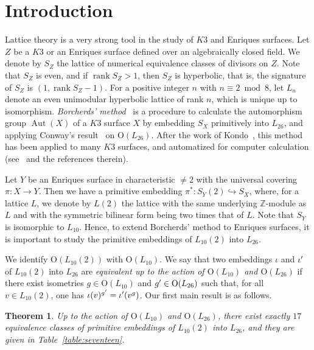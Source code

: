 \documentclass{amsart}
\newtheorem{theorem}{Theorem}[section]
\numberwithin{equation}{section}
\numberwithin{table}{section}
\numberwithin{figure}{section}
\newcommand{\Z}{\mathord{\mathbb Z}}
\newcommand{\inj}{\hookrightarrow}
\newcommand{\sprime}{\sp\prime}
\newcommand{\OG}{\mathord{\mathrm{O}}}
\newcommand{\Aut}{\operatorname{\mathrm{Aut}}\nolimits}
\newcommand{\rank}{\operatorname{\mathrm{rank}}\nolimits}
\begin{document}
\section{Introduction}\label{sec:intro}
%
Lattice theory is a
very strong tool in the study of $K3$ and Enriques surfaces.
Let $Z$ be a $K3$  or an Enriques surface defined over an algebraically closed field.
We denote by  $S_Z$  the lattice of numerical equivalence classes of
divisors on $Z$.
Note that $S_Z$ is even, and if $\rank S_Z>1$, then $S_Z$ is hyperbolic,
that is, the signature of $S_Z$ is $(1, \rank S_Z-1)$.
For a positive integer $n$ with $n\equiv 2\bmod 8$,
let $L_n$ denote an even unimodular hyperbolic lattice of rank $n$,
which is unique up to isomorphism.
\emph{Borcherds' method}~\cite{Bor1, Bor2} is a procedure to calculate
the automorphism group $\Aut(X)$ of a $K3$ surface $X$
by embedding $S_X$  primitively into 
$L_{26}$,
and applying Conway's result~\cite{Conway1983} on $\OG(L_{26})$.
After the work of Kondo~\cite{Kondo1998},
this method has been applied to many $K3$ surfaces,
and automatized for computer calculation (see~\cite{Shimada2015}  and the references therein).
\par
Let $Y$ be an Enriques surface in characteristic $\ne 2$
with the universal covering $\pi\colon X\to Y$.
Then we have a primitive embedding $\pi^*\colon S_Y(2)\inj S_X$,
where, for a lattice $L$, we denote by $L(2)$ the lattice
with the same underlying $\Z$-module as $L$
and with the symmetric bilinear form being two times that of $L$.
Note that $S_Y$ is isomorphic to $L_{10}$.
Hence, to extend Borcherds' method to
Enriques surfaces,
it is important to study the primitive embeddings of $L_{10}(2)$ into $L_{26}$.
\par
%
We identify $\OG(L_{10}(2))$ with $\OG(L_{10})$.
We say that two embeddings $\iota$ and $\iota\sprime$ of $L_{10}(2)$ into $L_{26}$ are
\emph{equivalent  up to the action of $\OG(L_{10})$ and $\OG(L_{26})$}
if there exist isometries $g\in \OG(L_{10})$ and $g\sprime \in \OG(L_{26})$
such that, for all $v\in L_{10}(2)$, one has  $\iota(v)^{g\sprime}=\iota\sprime(v^g)$.
Our first main result is as follows.
%
\begin{theorem}\label{thm:seventeen}
Up to the action of $\OG(L_{10})$ and $\OG(L_{26})$,
there exist exactly $17$ equivalence classes of
primitive embeddings of $L_{10}(2)$ into $L_{26}$,
and they are given in Table~\ref{table:seventeen}.
\end{theorem}
\end{document}
